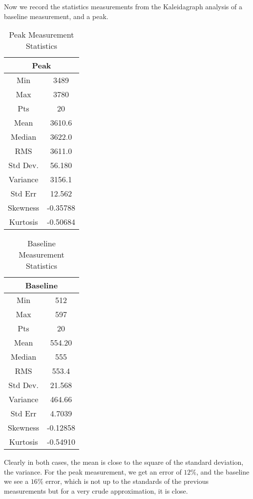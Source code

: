 \documentclass[letterpaper,12pt]{article}
\begin{document}
Now we record the statistics measurements from the Kaleidagraph analysis of a baseline measurement, and a peak.
\begin{table}[H]
\centering
\begin{tabular}{cc}
\multicolumn{2}{c}{Peak}                 \\ \hline
\multicolumn{1}{c|}{Min}      & 3489     \\
\multicolumn{1}{c|}{Max}      & 3780     \\
\multicolumn{1}{c|}{Pts}      & 20       \\
\multicolumn{1}{c|}{Mean}     & 3610.6   \\
\multicolumn{1}{c|}{Median}   & 3622.0   \\
\multicolumn{1}{c|}{RMS}      & 3611.0   \\
\multicolumn{1}{c|}{Std Dev.} & 56.180   \\
\multicolumn{1}{c|}{Variance} & 3156.1   \\
\multicolumn{1}{c|}{Std Err}  & 12.562   \\
\multicolumn{1}{c|}{Skewness} & -0.35788 \\
\multicolumn{1}{c|}{Kurtosis} & -0.50684
\end{tabular}
\caption{Peak Measurement Statistics}
\label{pstat}
\end{table}
\begin{table}[H]
\centering
\begin{tabular}{cc}
\multicolumn{2}{c}{Baseline}             \\ \hline
\multicolumn{1}{c|}{Min}      & 512      \\
\multicolumn{1}{c|}{Max}      & 597      \\
\multicolumn{1}{c|}{Pts}      & 20       \\
\multicolumn{1}{c|}{Mean}     & 554.20   \\
\multicolumn{1}{c|}{Median}   & 555      \\
\multicolumn{1}{c|}{RMS}      & 553.4    \\
\multicolumn{1}{c|}{Std Dev.} & 21.568   \\
\multicolumn{1}{c|}{Variance} & 464.66   \\
\multicolumn{1}{c|}{Std Err}  & 4.7039   \\
\multicolumn{1}{c|}{Skewness} & -0.12858 \\
\multicolumn{1}{c|}{Kurtosis} & -0.54910
\end{tabular}
\caption{Baseline Measurement Statistics}
\label{bstat}
\end{table}
Clearly in both cases, the mean is close to the square of the standard deviation, the variance. For the peak measurement, we get an error of $12\%$, and the baseline we see a $16\%$ error, which is not up to the standards of the previous measurements but for a very crude approximation, it is close. 
\end{document}
